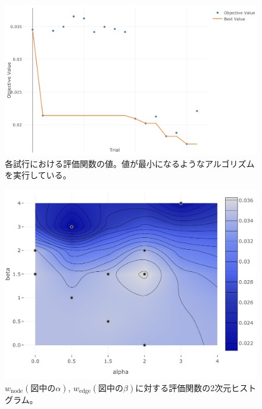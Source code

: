 \begin{figure}[H]
	\begin{center}
 \includegraphics[keepaspectratio, scale=0.3]
 	{Figure/Flavortagging/bayesian1.png}
 		\caption{各試行における評価関数の値。値が最小になるようなアルゴリズムを実行している。}
 		\label{bayes1}
	\end{center}
\end{figure}
\begin{figure}[H]
	\begin{center}
 \includegraphics[keepaspectratio, scale=0.3]
 	{Figure/Flavortagging/bayesian2.png}
 		\caption{$w_{\mathrm{node}} (図中の\alpha)$, $w_{\mathrm{edge}} (図中の\beta)$に対する評価関数の2次元ヒストグラム。}
 		\label{bayes2}
	\end{center}
\end{figure}
